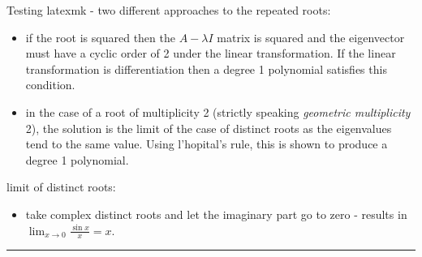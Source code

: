 \documentclass[../MathsNotesBase.tex]{subfiles}
\date{\vspace{-6ex}}
\begin{document}
	
	
Testing latexmk - two different approaches to the repeated roots:
	\begin{itemize}
	\item{if the root is squared then the ${ A - \lambda I }$ matrix is squared and the eigenvector must have a cyclic order of 2 under the linear transformation. If the linear transformation is differentiation then a degree 1 polynomial satisfies this condition.}
		\item{in the case of a root of multiplicity 2 (strictly speaking \textit{geometric multiplicity} 2), the solution is the limit of the case of distinct roots as the eigenvalues tend to the same value. Using l'hopital's rule, this is shown to produce a degree 1 polynomial.}
	\end{itemize}

	limit of distinct roots:
	\begin{itemize}
		\item{take complex distinct roots and let the imaginary part go to zero - results in ${ \lim_{x \to 0} \frac{\sin{x}}{x} = x }$.}
	\end{itemize}

	\hrule
	\biggerskip
	
\end{document}
